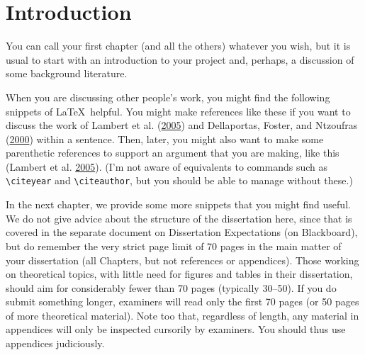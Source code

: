 \documentclass[
  12pt,
  a4paper,
  twoside]{book}
\begin{document}
\tableofcontents

\fancyhead{}
\fancyfoot{}
\pagestyle{fancy}
\fancyhead[RO,LE]{\thepage}
\fancyhead[LO,RE]{\rightmark}

\newcommand{\studentcomment}[1]{\todo[inline, backgroundcolor=blue!30]{\textsc{Student:} #1}}
\newcommand{\DSWcomment}[1]{\todo[inline, backgroundcolor=green!30]{\textsc{DSW:} #1}}
\newcommand{\supcomment}[1]{\todo[inline, backgroundcolor=red!30]{\textsc{Supervisor:} #1}}

\mainmatter

\hypertarget{Intro}{%
\chapter{Introduction}\label{Intro}}

You can call your first chapter (and all the others) whatever you wish, but it is usual to start with an introduction to your project and, perhaps, a discussion of some background literature.

When you are discussing other people's work, you might find the following snippets of \LaTeX~helpful. You might make references like these if you want to discuss the work of Lambert et al. (\protect\hyperlink{ref-lambert}{2005}) and Dellaportas, Foster, and Ntzoufras (\protect\hyperlink{ref-dellas}{2000}) within a sentence. Then, later, you might also want to make some parenthetic references to support an argument that you are making, like this (Lambert et al. \protect\hyperlink{ref-lambert}{2005}). (I'm not aware of equivalents to commands such as \texttt{\textbackslash{}citeyear} and \texttt{\textbackslash{}citeauthor}, but you should be able to manage without these.)

In the next chapter, we provide some more snippets that you might find useful. We do not give advice about the structure of the dissertation here, since that is covered in the separate document on Dissertation Expectations (on Blackboard), but do remember the very strict page limit of 70 pages in the main matter of your dissertation (all Chapters, but not references or appendices). Those working on theoretical topics, with little need for figures and tables in their dissertation, should aim for considerably fewer than 70 pages (typically 30--50). If you do submit something longer, examiners will read only the first 70 pages (or 50 pages of more theoretical material). Note too that, regardless of length, any material in appendices will only be inspected cursorily by examiners. You should thus use appendices judiciously.
\end{document}
